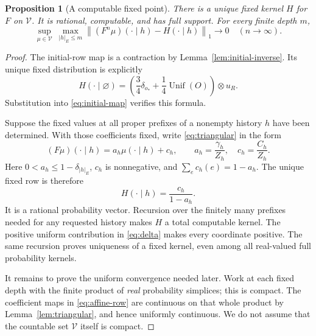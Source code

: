 \documentclass[11pt]{article}
\newtheorem{proposition}[theorem]{Proposition}
\theoremstyle{definition}
\theoremstyle{remark}
\newcommand{\V}{\mathcal V}
\newcommand{\norm}[1]{\left\lVert#1\right\rVert}
\begin{document}
\begin{proposition}[A computable fixed point]
\label{prop:fixed-point}
There is a unique fixed kernel $H$ for $F$ on $\V$.  It is rational,
computable, and has full support.  For every finite depth $m$,
\begin{equation}
  \sup_{\mu\in\V}\ \max_{|h|_E\le m}
       \norm{(F^n\mu)(\cdot\mid h)-H(\cdot\mid h)}_1
       \longrightarrow0
       \quad(n\to\infty).
  \label{eq:uniform-convergence}
\end{equation}
\end{proposition}

\begin{proof}
The initial-row map is a contraction by
Lemma~\ref{lem:initial-inverse}.  Its unique fixed distribution is
explicitly
\begin{equation}
  H(\cdot\mid\varnothing)=
  \left(\frac34\delta_{o_*}+\frac14\operatorname{Unif}(O)\right)
       \otimes u_R.
  \label{eq:initial-fixed}
\end{equation}
Substitution into \eqref{eq:initial-map} verifies this formula.

Suppose the fixed values at all proper prefixes of a nonempty history
$h$ have been determined.  With those coefficients fixed, write
\eqref{eq:triangular} in the form
\begin{equation}
  (F\mu)(\cdot\mid h)=a_h\mu(\cdot\mid h)+c_h,
  \qquad a_h=\frac{\gamma_h}{Z_h},\quad c_h=\frac{C_h}{Z_h}.
  \label{eq:affine-row}
\end{equation}
Here $0<a_h\le1-\delta_{|h|_E}$, $c_h$ is nonnegative, and
$\sum_ec_h(e)=1-a_h$.  The unique fixed row is therefore
\begin{equation}
  H(\cdot\mid h)=\frac{c_h}{1-a_h}.
  \label{eq:fixed-row}
\end{equation}
It is a rational probability vector.  Recursion over the finitely many
prefixes needed for any requested history makes $H$ a total computable
kernel.  The positive uniform contribution in
\eqref{eq:delta} makes every coordinate positive.  The same
recursion proves uniqueness of a fixed kernel, even among all
real-valued full probability kernels.

It remains to prove the uniform convergence needed later.  Work at
each fixed depth with the finite product of \emph{real} probability
simplices; this is compact.  The coefficient maps in
\eqref{eq:affine-row} are continuous on that whole product by
Lemma~\ref{lem:triangular}, and hence uniformly continuous.  We do
not assume that the countable set $\V$ itself is compact.


\end{proof}
\end{document}
